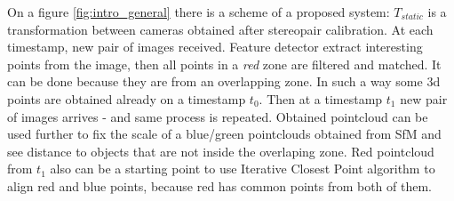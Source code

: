 On a figure \autoref{fig:intro_general} there is a scheme of a proposed system: $T_{static}$ is a transformation between cameras obtained after stereopair calibration. 
At each timestamp, new pair of images received.
Feature detector extract interesting points from the image, then all points in a \textit{red} zone are filtered and matched.
It can be done because they are from an overlapping zone. 
In such a way some 3d points are obtained already on a timestamp $t_0$. 
Then at a timestamp $t_1$ new pair of images arrives - and same process is repeated. 
Obtained pointcloud can be used further to fix the scale of a blue/green pointclouds obtained from SfM and see distance to objects that are not inside the overlaping zone.
Red pointcloud from $t_1$ also can be a starting point to use Iterative Closest Point algorithm to align red and blue points, because red has common points from both of them.